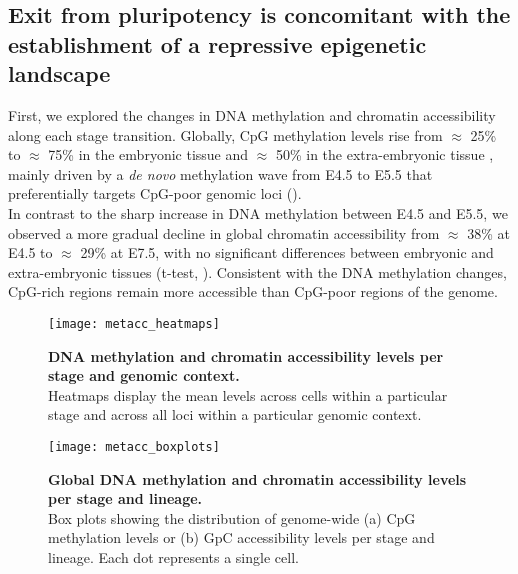 \subsection{Exit from pluripotency is concomitant with the establishment of a repressive epigenetic landscape}

First, we explored the changes in DNA methylation and chromatin accessibility along each stage transition. Globally, CpG methylation levels rise from $\approx$ 25\% to $\approx$ 75\% in the embryonic tissue and $\approx$ 50\% in the extra-embryonic tissue , mainly driven by a \textit{de novo} methylation wave from E4.5 to E5.5 that preferentially targets CpG-poor genomic loci \cite{Auclair2014,Zhang2017} ().\\
In contrast to the sharp increase in DNA methylation between E4.5 and E5.5, we observed a more gradual decline in global chromatin accessibility from $\approx$ 38\% at E4.5 to $\approx$ 29\% at E7.5, with no significant differences between embryonic and extra-embryonic tissues (t-test, ). Consistent with the DNA methylation changes, CpG-rich regions remain more accessible than CpG-poor regions of the genome.

\begin{figure}[H]
	\centering
	\texttt{[image: metacc\_heatmaps]}
	\caption[]{\textbf{DNA methylation and chromatin accessibility levels per stage and genomic context.}\\
	Heatmaps display the mean levels across cells within a particular stage and across all loci within a particular genomic context.
	}
	\label{fig:metacc_heatmaps}
\end{figure}

\begin{figure}[H]
	\centering
	\texttt{[image: metacc\_boxplots]}
	\caption[]{
	\textbf{Global DNA methylation and chromatin accessibility levels per stage and lineage.} \\
	Box plots showing the distribution of genome-wide (a) CpG methylation levels or (b) GpC accessibility levels per stage and lineage. Each dot represents a single cell.
	}
	\label{fig:metacc_boxplots}
\end{figure}


